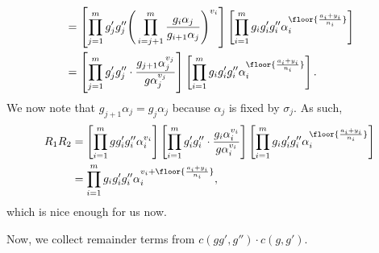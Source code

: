 \begin{enumerate}
\begin{align*}
		&= \left[\prod_{j=1}^mg'_jg''_j\Bigg(\prod_{i=j+1}^m\frac{g_i\alpha_j}{g_{i+1}\alpha_j}\Bigg)^{v_i}\right]\left[\prod_{i=1}^mg_ig'_ig''_i\alpha_i^{\floor{\frac{a_i+y_i}{n_i}}}\right] \\
		&= \left[\prod_{j=1}^mg'_jg''_j\cdot\frac{g_{j+1}\alpha_j^{v_j}}{g\alpha_j^{v_j}}\right]\left[\prod_{i=1}^mg_ig'_ig''_i\alpha_i^{\floor{\frac{a_i+y_i}{n_i}}}\right].
	\end{align*}
	We now note that $g_{j+1}\alpha_j=g_j\alpha_j$ because $\alpha_j$ is fixed by $\sigma_j$. As such,
	\begin{align*}
		R_1R_2 &= \left[\prod_{i=1}^mgg'_ig''_i\alpha_i^{v_i}\right]\left[\prod_{i=1}^mg'_ig''_i\cdot\frac{g_i\alpha_i^{v_i}}{g\alpha_i^{v_i}}\right]\left[\prod_{i=1}^mg_ig'_ig''_i\alpha_i^{\floor{\frac{a_i+y_i}{n_i}}}\right] \\
		&= \prod_{i=1}^mg_ig'_ig''_i\alpha_i^{v_i+\floor{\frac{a_i+y_i}{n_i}}},
	\end{align*}
	which is nice enough for us now.
\end{enumerate}
Now, we collect remainder terms from $c(gg',g'')\cdot c(g,g')$.
